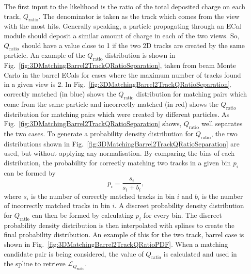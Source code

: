 The first input to the likelihood is the ratio of the total deposited charge on each track, $Q_{\textrm{ratio}}$.  The denominator is taken as the track which comes from the view with the most hits.  Generally speaking, a particle propagating through an ECal module should deposit a similar amount of charge in each of the two views.  So, $Q_{\textrm{ratio}}$ should have a value close to 1 if the two 2D tracks are created by the same particle.  An example of the $Q_{\textrm{ratio}}$ distribution is shown in Fig.~\ref{fig:3DMatchingBarrel2TrackQRatioSeparation}, taken from beam Monte Carlo in the barrel ECals for cases where the maximum number of tracks found in a given view is 2.  In Fig.~\ref{fig:3DMatchingBarrel2TrackQRatioSeparation}, correctly matched (in blue) shows the $Q_{\textrm{ratio}}$ distribution for matching pairs which come from the same particle and incorrectly matched (in red) shows the $Q_{\textrm{ratio}}$ distribution for matching pairs which were created by different particles.  As Fig.~\ref{fig:3DMatchingBarrel2TrackQRatioSeparation} shows, $Q_{\textrm{ratio}}$ well separates the two cases.  To generate a probability density distribution for $Q_{\textrm{ratio}}$, the two distributions shown in Fig.~\ref{fig:3DMatchingBarrel2TrackQRatioSeparation} are used, but without applying any normalisation.  By comparing the bins of each distribution, the probability for correctly matching two tracks in a given bin $p_{i}$ can be formed by
\begin{equation}
  p_i = \frac{s_i}{s_i + b_i}
  \label{eq:BinProbabilityPDF},
\end{equation}
where $s_i$ is the number of correctly matched tracks in bin $i$ and $b_i$ is the number of incorrectly matched tracks in bin $i$.  A discreet probability density distribution for $Q_{\textrm{ratio}}$ can then be formed by calculating $p_i$ for every bin.  The discreet probability density distribution is then interpolated with splines to create the final probability distribution.  An example of this for the two track, barrel case is shown in Fig.~\ref{fig:3DMatchingBarrel2TrackQRatioPDF}.  When a matching candidate pair is being considered, the value of $Q_{\textrm{ratio}}$ is calculated and used in the spline to retrieve $\mathcal{L}_{Q_{\textrm{ratio}}}$.
